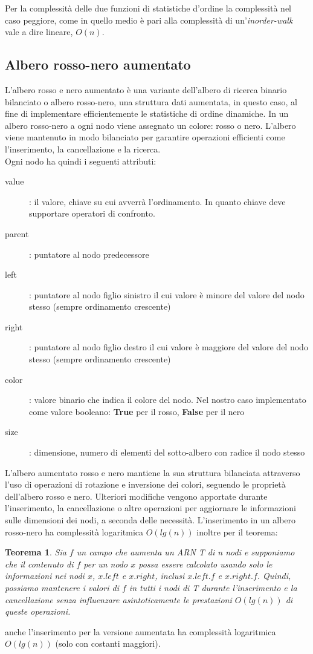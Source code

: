 \documentclass{article}
\newtheorem{theorem}{Teorema}
\begin{document}
\noindent Per la complessità delle due funzioni di statistiche d'ordine la complessità nel caso peggiore, come in quello medio è pari alla complessità di un'\textit{inorder-walk} vale a dire lineare, $O(n)$.

\subsection*{Albero rosso-nero aumentato}
L'albero rosso e nero aumentato è una variante dell'albero di ricerca binario bilanciato o albero rosso-nero, una struttura dati aumentata, in questo caso, al fine di implementare efficientemente le statistiche di ordine dinamiche. In un albero rosso-nero a ogni nodo viene assegnato un colore: rosso o nero. L'albero viene mantenuto in modo bilanciato per garantire operazioni efficienti come l'inserimento, la cancellazione e la ricerca. \\

\noindent Ogni nodo ha quindi i seguenti attributi: 

\begin{description}
    \item[value]: il valore, chiave su cui avverrà l'ordinamento. In quanto chiave deve supportare operatori di confronto.
    \item[parent]: puntatore al nodo predecessore
    \item[left]: puntatore al nodo figlio sinistro il cui valore è minore del valore del nodo stesso (sempre ordinamento crescente)
    \item[right]: puntatore al nodo figlio destro il cui valore è maggiore del valore del nodo stesso (sempre ordinamento crescente)
    \item[color]: valore binario che indica il colore del nodo. Nel nostro caso implementato come valore booleano: \textbf{True} per il rosso, \textbf{False} per il nero
    \item[size]: dimensione, numero di elementi del sotto-albero con radice il nodo stesso
\end{description}

\noindent L'albero aumentato rosso e nero mantiene la sua struttura bilanciata attraverso l'uso di operazioni di rotazione e inversione dei colori, seguendo le proprietà dell'albero rosso e nero. Ulteriori modifiche vengono apportate durante l'inserimento, la cancellazione o altre operazioni per aggiornare le informazioni sulle dimensioni dei nodi, a seconda delle necessità. L'inserimento in un albero rosso-nero ha complessità logaritmica $O(lg(n))$ inoltre per il teorema: 
\begin{theorem}
Sia ${f}$ un campo che aumenta un ARN T di n nodi e supponiamo che il contenuto di ${f}$ per un nodo ${x}$ possa essere calcolato usando solo le informazioni nei nodi ${x}$, ${x.left}$ e ${x.right}$, inclusi ${x.left.f}$ e ${x.right.f}$. Quindi, possiamo mantenere i valori di ${f}$ in tutti i nodi di T durante l'inserimento e la cancellazione senza influenzare asintoticamente le prestazioni $O(lg(n))$ di queste operazioni.
\end{theorem}
anche l'inserimento per la versione aumentata ha complessità logaritmica $O(lg(n))$ (solo con costanti maggiori). \\
\end{document}
